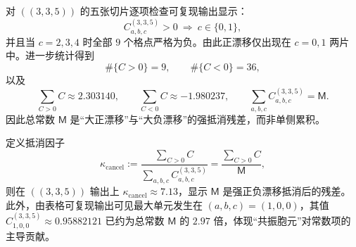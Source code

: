 \begin{remark}[符号相变阈值与正漂移稀疏性]\label{cor:arity-335-sign-sparsity}
对 \(((3,3,5))\) 的五张切片逐项检查可复现输出显示：
\[
C^{(3,3,5)}_{a,b,c}>0\ \Longrightarrow\ c\in\{0,1\},
\]
并且当 $c=2,3,4$ 时全部 $9$ 个格点严格为负。由此正漂移仅出现在 $c=0,1$ 两片中。进一步统计得到
\[
\#\{C>0\}=9,\qquad \#\{C<0\}=36,
\]
以及
\[
\sum_{C>0}C\approx 2.303140,\qquad
\sum_{C<0}C\approx -1.980237,\qquad
\sum_{a,b,c}C^{(3,3,5)}_{a,b,c}=\mathsf{M}.
\]
因此总常数 $\mathsf{M}$ 是“大正漂移”与“大负漂移”的强抵消残差，而非单侧累积。
\end{remark}

\begin{remark}[抵消因子与共振胞元]\label{rem:arity-335-cancel-resonant}
定义抵消因子
\[
\kappa_{\mathrm{cancel}}:=\frac{\sum_{C>0}C}{\sum_{a,b,c}C^{(3,3,5)}_{a,b,c}}
=\frac{\sum_{C>0}C}{\mathsf{M}},
\]
则在 \(((3,3,5))\) 输出上
\(
\kappa_{\mathrm{cancel}}\approx 7.13
\)，显示 $\mathsf{M}$ 是强正负漂移抵消后的残差。
此外，由表格可复现输出可见最大单元发生在
\(
(a,b,c)=(1,0,0)
\)，其值
\(
C^{(3,3,5)}_{1,0,0}\approx 0.95882121
\)
已约为总常数 $\mathsf{M}$ 的 $2.97$ 倍，体现“共振胞元”对常数项的主导贡献。
\end{remark}
